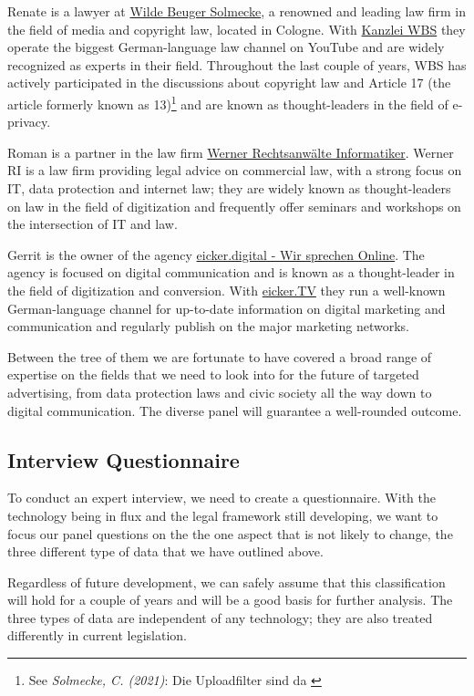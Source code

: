 Renate is a lawyer at \href{https://www.wbs-law.de/}{Wilde Beuger Solmecke}, a renowned and leading law firm in the field of media and copyright law, located in Cologne. With \href{https://www.youtube.com/user/KanzleiWBS}{Kanzlei WBS} they operate the biggest German-language law channel on YouTube and are widely recognized as experts in their field. Throughout the last couple of years, WBS has actively participated in the discussions about copyright law and Article 17 (the article formerly known as 13)\footnote{See \textit{Solmecke, C. (2021)}: Die Uploadfilter sind da \cite{article17}} and are known as thought-leaders in the field of e-privacy.

Roman is a partner in the law firm \href{https://www.werner-ri.de/}{Werner Rechtsanwälte Informatiker}. Werner RI is a law firm providing legal advice on commercial law, with a strong focus on IT, data protection and internet law; they are widely known as thought-leaders on law in the field of digitization and frequently offer seminars and workshops on the intersection of IT and law.

Gerrit is the owner of the agency \href{https://eicker.digital/}{eicker.digital - Wir sprechen Online}. The agency is focused on digital communication and is known as a thought-leader in the field of digitization and conversion. With \href{https://www.youtube.com/eickertv}{eicker.TV} they run a well-known German-language channel for up-to-date information on digital marketing and communication and regularly publish on the major marketing networks.

Between the tree of them we are fortunate to have covered a broad range of expertise on the fields that we need to look into for the future of targeted advertising, from data protection laws and civic society all the way down to digital communication. The diverse panel will guarantee a well-rounded outcome.

\subsection{Interview Questionnaire}

To conduct an expert interview, we need to create a questionnaire. With the technology being in flux and the legal framework still developing, we want to focus our panel questions on the the one aspect that is not likely to change, the three different type of data that we have outlined above.

Regardless of future development, we can safely assume that this classification will hold for a couple of years and will be a good basis for further analysis. The three types of data are independent of any technology; they are also treated differently in current legislation.

